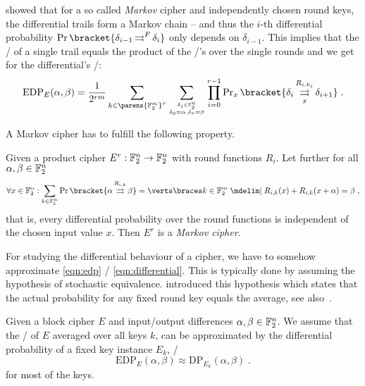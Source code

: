 \textcite[Section~3]{EC:LaiMasMur91} showed that for a so called \emph{Markov} cipher and independently chosen round keys, the differential trails form a Markov chain -- and thus the $i$-th differential probability $\Prob\bracket{\propDiff{\delta_{i-1}}{F}{}{\delta_{i}}}$ only depends on $\delta_{i-1}$.
This implies that the \EDP/ of a single trail equals the product of the \EDP/'s over the single rounds and we get for the differential's \EDP/:
\begin{equation}\label{eqn:differential}
    \mathrm{EDP}_E(\alpha, \beta)
    = \frac{1}{2^{rm}}
      \sum_{k \in \parens{\F_2^m}^r}
      \sum_{\tower{\delta_i \in \F_2^n}{\delta_0 = \alpha, \delta_r = \beta}}
      \prod_{i=0}^{r-1}
      \Prob_x\bracket{\propDiff{\delta_i}{R_{i,k_i}}{x}{\delta_{i+1}}}\;.
\end{equation}

A Markov cipher has to fulfill the following property.
\begin{definition}
    Given a product cipher $E^r : \mathbb{F}_2^n \to \mathbb{F}_2^n$ with round functions $R_i$.
    Let further for all $\alpha, \beta \in \mathbb{F}_2^n$
    \begin{equation*}
        \forall x \in \F_2^n : \sum_{k \in \F_2^m} \Prob\bracket{\propDiff{\alpha}{R_{i,k}}{}{\beta}} = \abs{\set{k \in \F_2^m \given R_{i,k}(x) + R_{i,k}(x+\alpha) = \beta}}\;,
    \end{equation*}
    that is, every differential probability over the round functions is independent of the chosen input value $x$.
    Then $E^r$ is a \emph{Markov cipher}.
\end{definition}

For studying the differential behaviour of a cipher, we have to somehow approximate \cref{eqn:edp} \resp/ \cref{eqn:differential}.
This is typically done by assuming the hypothesis of stochastic equivalence.
\textcite{EC:LaiMasMur91} introduced this hypothesis which states that the actual probability for any fixed round key equals the average, see also~\cite[p.~121]{rijndael_book}.
\begin{hypothesis}\label{hypo:equiv}
    Given a block cipher $E$ and input/output differences $\alpha, \beta \in \mathbb{F}_2^n$.
    We assume that the \EDP/ of $E$ averaged over all keys $k$, can be approximated by the differential probability of a fixed key instance $E_k$, \ie/
    \begin{equation*}
        \mathrm{EDP}_E(\alpha, \beta)
        \approx \mathrm{DP}_{E_k}(\alpha, \beta)\;.
    \end{equation*}
    for most of the keys.
\end{hypothesis}

